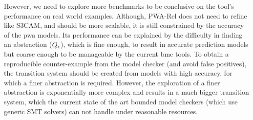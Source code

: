 However, we need to explore more benchmarks to be conclusive on the
tool's performance on real world examples. Although, PWA-Rel does not
need to refine like S3CAM, and should be more scalable, it is still
constrained by the accuracy of the pwa models. Its performance can be
explained by the difficulty in finding an abstraction
($Q_\epsilon$), which is fine enough, to result in accurate
prediction models but coarse enough to be manageable by the current
bmc tools.  To obtain a reproducible counter-example from the model
checker (and avoid false positives), the transition system should be
created from models with high accuracy, for which a finer abstraction
is required.  However, the exploration of a finer abstraction is
exponentially more complex and results in a much bigger transition
system, which the current state of the art bounded model checkers
(which use generic SMT solvers) can not handle under reasonable
resources.

